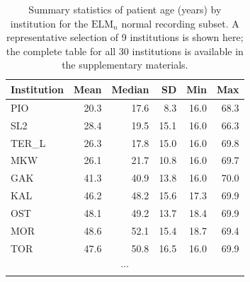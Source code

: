 \documentclass[preprint,12pt]{elsarticle}
\begin{document}
\begin{table}[htbp]
  \centering
  \caption{Summary statistics of patient age (years) by institution
    for the $\mathrm{ELM}_n$ normal recording subset.
    A representative selection of 9 institutions is shown here;
    the complete table for all 30 institutions is available in the
    supplementary materials.}
  \label{tab:age_stats}
  \begin{tabular}{lrrrrr}
    \toprule
    \textbf{Institution} & \textbf{Mean} & \textbf{Median} &
    \textbf{SD} & \textbf{Min} & \textbf{Max} \\
    \midrule
    PIO    & 20.3 & 17.6 & 8.3  & 16.0 & 68.3 \\
    SL2    & 28.4 & 19.5 & 15.1 & 16.0 & 66.3 \\
    TER\_L & 26.3 & 17.8 & 15.0 & 16.0 & 69.8 \\
    MKW    & 26.1 & 21.7 & 10.8 & 16.0 & 69.7 \\
    GAK    & 41.3 & 40.9 & 13.8 & 16.0 & 70.0 \\
    KAL    & 46.2 & 48.2 & 15.6 & 17.3 & 69.9 \\
    OST    & 48.1 & 49.2 & 13.7 & 18.4 & 69.9 \\
    MOR    & 48.6 & 52.1 & 15.4 & 18.7 & 69.4 \\
    TOR    & 47.6 & 50.8 & 16.5 & 16.0 & 69.9 \\
    \multicolumn{6}{c}{$\cdots$} \\
    \bottomrule
  \end{tabular}
\end{table}



\end{document}

